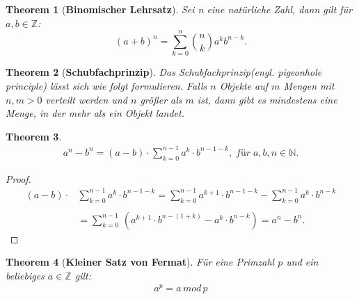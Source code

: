 \documentclass[12pt,oneside]{article}
\newtheorem{theorem}{Theorem}[section]
\theoremstyle{remark}
\theoremstyle{definition}
\begin{document}
\smallskip

\begin{theorem}[\textbf{Binomischer Lehrsatz}]\label{Th_3}
Sei n eine natürliche Zahl, dann gilt für $a,b \in \mathbb{Z}$:\newline\newline
 \begin{equation}
     (a + b)^n  = \sum_{k=0}^n {n \choose k} a^k b^{n-k}.
 \end{equation}
\end{theorem}

\smallskip

\begin{theorem}[\textbf{Schubfachprinzip}]\label{pigeonhole} Das Schubfachprinzip(engl. pigeonhole principle) lässt sich wie folgt formulieren.
Falls $n$ Objekte auf $m$ Mengen mit $n,m > 0$ verteilt werden und $n$ größer als $m$ ist, dann gibt es mindestens eine Menge, in der mehr als ein Objekt landet. 

\end{theorem}

\smallskip

\begin{theorem}\label{funny_id}
\begin{align*}
a^{n} - b^n = (a - b) \cdot \sum_{k = 0}^{n - 1} a^{k} \cdot  b^{n - 1 - k}, \; für \; a,b,n \in \mathbb{N}.
\end{align*} 
\end{theorem}

\begin{proof}
\begin{align*}
(a - b) \cdot &\sum_{k = 0}^{n - 1} a^{k} \cdot  b^{n - 1 - k} = \sum_{k = 0}^{n - 1} a^{k + 1}\cdot b^{n - 1 - k} - \sum_{k = 0}^{n - 1} a^k \cdot b^{n - k} \\
\\
&= \sum_{k = 0}^{n - 1} \, (a^{k + 1}\cdot b^{n - (1 + k)} -a^k \cdot b^{n - k}) = a^n - b^n.
\end{align*}
\end{proof}

\smallskip

\begin{theorem}[\textbf{Kleiner Satz von Fermat}]\label{Th_2}
Für eine Primzahl $p$ und ein beliebiges $a \in \mathbb{Z}$ gilt:
\begin{align*}
    a^p = a \, mod \, p
\end{align*}
\end{theorem}
\end{document}
